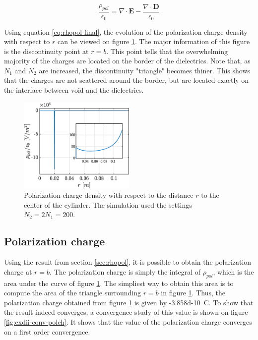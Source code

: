 \documentclass[a4paper,12pt,twoside]{article}
\newcommand{\Div}[1]{\nabla\cdot\mathbf{#1}}
\begin{document}
    \begin{equation}
      \boxed{\frac{\rho_{pol}}{\epsilon_0} = \Div{E} - \frac{\Div{D}}{\epsilon_0}}
      \label{eq:rhopol-final}
    \end{equation}

    Using equation \eqref{eq:rhopol-final}, the evolution of the polarization charge density with respect to $r$ can be viewed on figure \ref{fig:rhopol}.
    The major information of this figure is the discontinuity point at $r=b$.
    This point tells that the overwhelming majority of the charges are located on the border of the dielectrics.
    Note that, as $N_1$ and $N_2$ are increased, the discontinuity "triangle" becomes thiner.
    This shows that the charges are not scattered around the border, but are located exactly on the interface between void and the dielectrics.

    \begin{figure}[h]
      \centering
      \includegraphics[width=0.5\textwidth]{graphs/exdii-rhopol.eps}
      \caption{Polarization charge density with respect to the distance $r$ to the center of the cylinder. The simulation used the settings $N_2 = 2N_1 = 200$.}
      \label{fig:rhopol}
    \end{figure}


  \subsection{Polarization charge}
  Using the result from section \ref{sec:rhopol}, it is possible to obtain the polarization charge at $r=b$.
  The polarization charge is simply the integral of $\rho_{pol}$, which is the area under the curve of figure \ref{fig:rhopol}.
  The simpliest way to obtain this area is to compute the area of the triangle surrounding $r=b$ in figure \ref{fig:rhopol}.
  Thus, the polarization charge obtained from figure \ref{fig:rhopol} is given by \SI{-3.858d-10}{\coulomb}.
  To show that the result indeed converges, a convergence study of this value is shown on figure \ref{fig:exdii-conv-polch}.
  It shows that the value of the polarization charge converges on a first order convergence.
\end{document}
